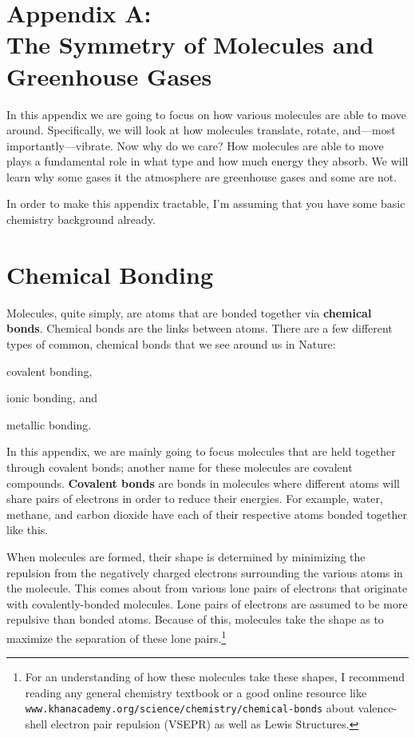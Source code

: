 

\newpage
\section*{\label{app:symmetry}{\LARGE{Appendix A:}}\\The Symmetry of Molecules and Greenhouse Gases}

    In this appendix we are going to focus on how various molecules are able to move around. Specifically, we will look at how molecules translate, rotate, and---most importantly---vibrate. Now why do we care? How molecules are able to move plays a fundamental role in what type and how much energy they absorb. We will learn why some gases it the atmosphere are greenhouse gases and some are not.

    In order to make this appendix tractable, I'm assuming that you have some basic chemistry background already.

    \section*{Chemical Bonding} %
    \label{sec:bonding}
            
    Molecules, quite simply, are atoms that are bonded together via \textbf{chemical bonds}. Chemical bonds are the links between atoms.\cite{atkins2014physical} There are a few different types of common, chemical bonds that we see around us in Nature:
    \begin{enumerate*}[(1)]
        \item covalent bonding,
        \item ionic bonding, and
        \item metallic bonding.
    \end{enumerate*}
    In this appendix, we are mainly going to focus molecules that are held together through covalent bonds; another name for these molecules are covalent compounds. \textbf{Covalent bonds} are bonds in molecules where different atoms will share pairs of electrons in order to reduce their energies. For example, water, methane, and carbon dioxide have each of their respective atoms bonded together like this.

    When molecules are formed, their shape is determined by minimizing the repulsion from the negatively charged electrons surrounding the various atoms in the molecule.\cite{atkins2014physical} This comes about from various lone pairs of electrons that originate with covalently-bonded molecules. Lone pairs of electrons are assumed to be more repulsive than bonded atoms. Because of this, molecules take the shape as to maximize the separation of these lone pairs.\footnote{For an understanding of how these molecules take these shapes, I recommend reading any general chemistry textbook or a good online resource like \texttt{www.khanacademy.org/science/chemistry/chemical-bonds} about valence-shell electron pair repulsion (VSEPR) as well as Lewis Structures.} 

